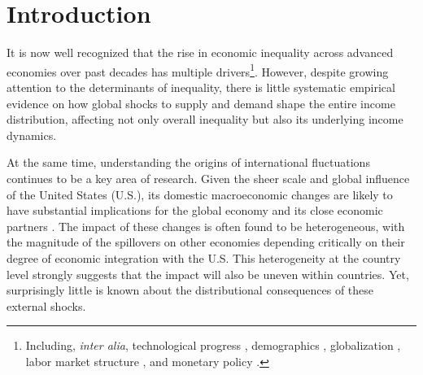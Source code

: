 \documentclass[12pt, a4paper]{article}
\begin{document}



\section{Introduction}
It is now well recognized that the rise in economic inequality across advanced economies over past decades has multiple drivers\footnote{Including, \emph{inter alia}, technological progress \parencite{Bound1995, Acemoglu2002}, demographics \parencite{Karahan2013}, globalization \parencite{feenstra2003global}, labor market structure \parencite{jaumotte2015inequality}, and monetary policy \parencite{coibion2017innocent, furceri2018effects, Amberg2022, andersen2023monetary}.}. However, despite growing attention to the determinants of inequality, there is little systematic empirical evidence on how global shocks to supply and demand shape the entire income distribution, affecting not only overall inequality but also its underlying income dynamics.

At the same time, understanding the origins of international fluctuations continues to be a key area of research. Given the sheer scale and global influence of the United States (U.S.), its domestic macroeconomic changes are likely to have substantial implications for the global economy and its close economic partners \parencite{Kose2003, canova2005transmission, Kose2012, kose2017global, kalemli2013global, Fink2015, rey2016, ramey2016macroeconomic, miranda2022global, carrillo2020inquiry, levchenko2020tfp, lakdawala2021international, dees2021global, di2022international, lastauskas2023global}. The impact of these changes is often found to be heterogeneous, with the magnitude of the spillovers on other economies depending critically on their degree of economic integration with the U.S. This heterogeneity at the country level strongly suggests that the impact will also be uneven within countries. Yet, surprisingly little is known about the distributional consequences of these external shocks.
\end{document}
